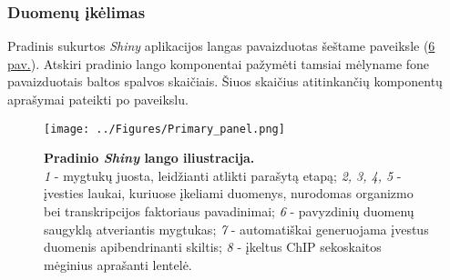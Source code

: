 \documentclass[12pt]{article}
\begin{document}
\subsubsection*{Duomenų įkėlimas}
Pradinis sukurtos \emph{Shiny} aplikacijos langas pavaizduotas šeštame
paveiksle (\hyperref[fig:image6]{6 pav.}).
Atskiri pradinio lango komponentai pažymėti tamsiai mėlyname fone pavaizduotais
baltos spalvos skaičiais. Šiuos skaičius atitinkančių komponentų aprašymai
pateikti po paveikslu.

\begin{figure}[ht]
    \begin{center}
        \captionsetup{justification=centering}
        \texttt{[image: ../Figures/Primary\_panel.png]}
        \vspace{-1.5\baselineskip}
        \caption{\small\textbf{Pradinio \emph{Shiny} lango iliustracija.}\\
            \emph{1} - mygtukų juosta, leidžianti atlikti parašytą etapą;
            \emph{2, 3, 4, 5} - įvesties laukai, kuriuose įkeliami duomenys,
                nurodomas organizmo bei transkripcijos faktoriaus pavadinimai;
            \emph{6} - pavyzdinių duomenų saugyklą atveriantis mygtukas;
            \emph{7} - automatiškai generuojama įvestus duomenis apibendrinanti
                skiltis;
            \emph{8} - įkeltus ChIP sekoskaitos mėginius aprašanti lentelė.}
        \label{fig:image6}
    \end{center}
\end{figure}

\newpage
\end{document}
